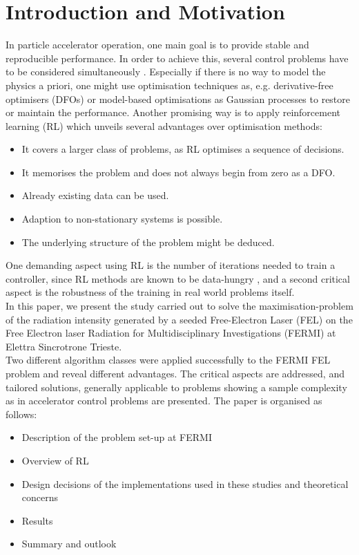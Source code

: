 \documentclass[
reprint,
amsmath,amssymb,amsfonts,clevref,
aps,
prstab,
]{revtex4-2}
\begin{document}
	\section{Introduction and Motivation}
	In particle accelerator operation, one main goal is to provide stable and reproducible performance. In order to achieve this, several control problems have to be considered simultaneously \cite{Kain2020}. Especially if there is no way to model the physics a priori, one might use optimisation techniques as, e.g. derivative-free optimisers (DFOs) \cite{Huang2013,Bruchon2017,Scheinker2020,Hirlaender2019,Welsch2015,Albright2019} or model-based optimisations as Gaussian processes \cite{Hanuka2020,Roussel2020} to restore or maintain the performance. Another promising way is to apply reinforcement learning (RL) \cite{Bruchon2020,Bruchon2019,Kain2020,Pang2020} which unveils several advantages over optimisation methods:
	\begin{itemize}
		\item It covers a larger class of problems, as RL optimises a sequence of decisions.
		\item It memorises the problem and does not always begin from zero as a DFO.
		\item Already existing data can be used.
		\item Adaption to non-stationary systems is possible.
		\item The underlying structure of the problem might be deduced.
	\end{itemize}
	One demanding aspect using RL is the number of iterations needed to train a controller, since RL methods are known to be data-hungry \cite{Sutton2018}, and a second critical aspect is the robustness of the training in real world problems itself.\\
	In this paper, we present the study carried out to solve the maximisation-problem of the radiation intensity generated by a seeded Free-Electron Laser (FEL) on the Free Electron laser Radiation for Multidisciplinary Investigations (FERMI) at Elettra Sincrotrone Trieste.\\
	 Two different algorithm classes were applied successfully to the FERMI FEL problem and reveal different advantages. The critical aspects are addressed, and tailored solutions, generally applicable to problems showing a sample complexity as in accelerator control problems are presented.
	The paper is organised as follows:
	\begin{itemize}
		\item Description of the problem set-up at FERMI
		\item Overview of RL
		\item Design decisions of the implementations used in these studies and theoretical concerns
		\item Results 
		\item Summary and outlook
	\end{itemize}
\end{document}

